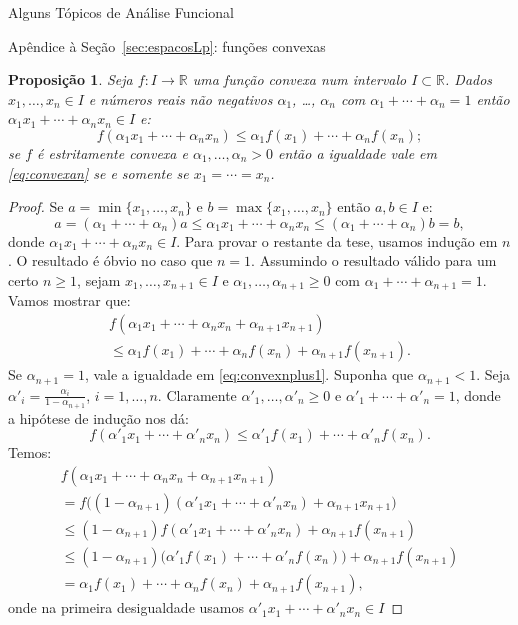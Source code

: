 \documentclass[oneside,final,11pt]{amsbook}
\newcommand{\R}{\mathds R}
\theoremstyle{remark}\newtheorem{exercise}{Exercício}[chapter]
\theoremstyle{remark}\newtheorem{*exercise}[exercise]{\hbox to 0pt{\hskip 0pt minus 1fil*}Exercício}
\theoremstyle{definition}\newtheorem{exdefin}{Definição}[chapter]
\theoremstyle{plain}\newtheorem{teo}{Teorema}[section]
\theoremstyle{plain}\newtheorem{lem}[teo]{Lema}
\theoremstyle{plain}\newtheorem{prop}[teo]{Proposição}
\theoremstyle{plain}\newtheorem{cor}[teo]{Corolário}
\theoremstyle{definition}\newtheorem{defin}[teo]{Definição}
\theoremstyle{remark}\newtheorem{rem}[teo]{Observação}
\theoremstyle{definition}\newtheorem{notation}[teo]{Notação}
\theoremstyle{definition}\newtheorem{convention}[teo]{Convenção}
\theoremstyle{definition}\newtheorem{example}[teo]{Exemplo}
\numberwithin{section}{chapter}
\numberwithin{equation}{section}
\begin{document}
\begin{chapter}{Alguns Tópicos de Análise Funcional}
\begin{section}{Apêndice à Seção~\ref{sec:espacosLp}: funções convexas}
\begin{prop}\label{thm:Jensenfinito}
Seja $f:I\to\R$ uma função convexa num intervalo $I\subset\R$. Dados $x_1,\ldots,x_n\in I$
e números reais não negativos $\alpha_1$, \dots, $\alpha_n$ com $\alpha_1+\cdots+\alpha_n=1$ então
$\alpha_1x_1+\cdots+\alpha_nx_n\in I$ e:
\begin{equation}\label{eq:convexan}
f(\alpha_1x_1+\cdots+\alpha_nx_n)\le\alpha_1f(x_1)+\cdots+\alpha_nf(x_n);
\end{equation}
se $f$ é estritamente convexa e $\alpha_1,\ldots,\alpha_n>0$ então a igualdade vale em \eqref{eq:convexan}
se e somente se $x_1=\cdots=x_n$.
\end{prop}
\begin{proof}
Se $a=\min\{x_1,\ldots,x_n\}$ e $b=\max\{x_1,\ldots,x_n\}$ então $a,b\in I$ e:
\[a=(\alpha_1+\cdots+\alpha_n)a\le\alpha_1x_1+\cdots+\alpha_nx_n\le
(\alpha_1+\cdots+\alpha_n)b=b,\]
donde $\alpha_1x_1+\cdots+\alpha_nx_n\in I$. Para provar o restante da tese, usamos indução em $n$.
O resultado é óbvio no caso que $n=1$. Assumindo o resultado válido para
um certo $n\ge1$, sejam $x_1,\ldots,x_{n+1}\in I$ e $\alpha_1,\ldots,\alpha_{n+1}\ge0$
com $\alpha_1+\cdots+\alpha_{n+1}=1$. Vamos mostrar que:
\begin{multline}\label{eq:convexnplus1}
f(\alpha_1x_1+\cdots+\alpha_nx_n+\alpha_{n+1}x_{n+1})\\
\le\alpha_1f(x_1)+\cdots+\alpha_nf(x_n)+\alpha_{n+1}f(x_{n+1}).
\end{multline}
Se $\alpha_{n+1}=1$, vale a igualdade em \eqref{eq:convexnplus1}. Suponha que $\alpha_{n+1}<1$.
Seja $\alpha'_i=\frac{\alpha_i}{1-\alpha_{n+1}}$, $i=1,\ldots,n$. Claramente $\alpha'_1,\ldots,\alpha'_n\ge0$
e $\alpha'_1+\cdots+\alpha'_n=1$, donde a hipótese de indução nos dá:
\[f(\alpha'_1x_1+\cdots+\alpha'_nx_n)\le\alpha'_1f(x_1)+\cdots+\alpha'_nf(x_n).\]
Temos:
\begin{multline}\label{eq:convexinducao}
f(\alpha_1x_1+\cdots+\alpha_nx_n+\alpha_{n+1}x_{n+1})\\
=f\big((1-\alpha_{n+1})(\alpha'_1x_1+\cdots+\alpha'_nx_n)+\alpha_{n+1}x_{n+1}\big)\\
\le(1-\alpha_{n+1})f(\alpha'_1x_1+\cdots+\alpha'_nx_n)+\alpha_{n+1}f(x_{n+1})\\
\le(1-\alpha_{n+1})\big(\alpha'_1f(x_1)+\cdots+\alpha'_nf(x_n)\big)+\alpha_{n+1}f(x_{n+1})\\
=\alpha_1f(x_1)+\cdots+\alpha_nf(x_n)+\alpha_{n+1}f(x_{n+1}),
\end{multline}
onde na primeira desigualdade usamos $\alpha'_1x_1+\cdots+\alpha'_nx_n\in I$

\end{proof}
\end{section}
\end{chapter}
\end{document}
